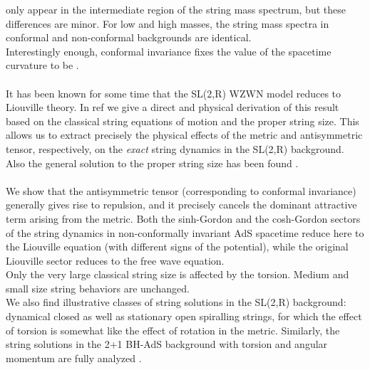 \documentclass[12pt,a4paper]{article}
\begin{document}
only appear in the intermediate region of the string mass spectrum, but these 
differences are minor. For low and high masses, the string mass spectra in 
conformal and non-conformal backgrounds are identical. \\ Interestingly enough, 
conformal invariance fixes the value of the spacetime curvature to be 
\coordHE{}. \\ \\
It has been known for some time that the SL(2,R) WZWN model reduces to 
Liouville theory. In ref \cite{ls6} we give a direct and physical derivation 
of this result based on the classical string equations of motion and the 
proper string size. This allows us to extract precisely the physical effects of the metric and antisymmetric tensor, respectively, on the {\it exact} string 
dynamics in the SL(2,R) background. Also the general solution to the proper 
string size has been found \cite{ls6}. \\ \\
We show that the antisymmetric tensor (corresponding to conformal invariance) 
generally gives rise to repulsion, and it precisely cancels the dominant 
attractive term arising from the metric. Both the sinh-Gordon and the 
cosh-Gordon sectors of the string dynamics in non-conformally invariant AdS 
spacetime reduce here to the Liouville equation (with different signs of the 
potential), while the original Liouville sector reduces to the free wave 
equation. \\
Only the very large classical string size is affected by the torsion. Medium 
and small size string behaviors are unchanged. \\
We also find illustrative classes of string solutions in the SL(2,R) background: dynamical closed as well as stationary open spiralling strings, for which 
the effect of torsion is somewhat like the effect of rotation in the metric. 
Similarly, the string solutions in the 2+1 BH-AdS background with torsion and 
angular momentum are fully analyzed \cite{ls6}.
\end{document}
